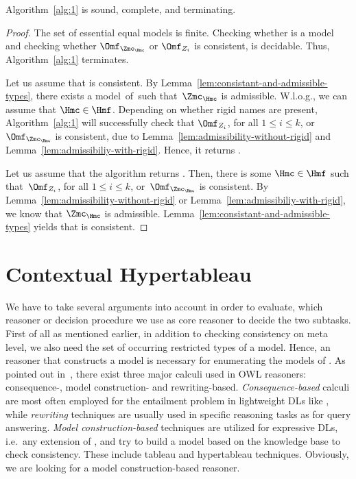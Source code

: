 \begin{lemma}\label{lem:alg1-sound-complete-terminating}
  Algorithm~\ref{alg:1} is sound, complete, and terminating.
\end{lemma}
\begin{proof}
  The set of essential equal models is finite. Checking whether \Hmc is a model and checking whether
  $\Omf_{\Zmc_{\Hmc}}$ or $\Omf_{Z_{i}}$ is consistent, is decidable. Thus, Algorithm~\ref{alg:1}
  terminates.

  Let us assume that \Bmf is consistent. By Lemma~\ref{lem:consistant-and-admissible-types}, there
  exists a model~\Hmc of~\Bmfb such that~$\Zmc_{\Hmc}$ is admissible. W.l.o.g., we can assume that
  $\Hmc\in\Hmf$. 
  Depending on whether rigid names are present, Algorithm~\ref{alg:1} will successfully check that
  $\Omf_{Z_{i}}$, for all $1\leq i \leq k$, or $\Omf_{\Zmc_{\Hmc}}$ is consistent, due to
  Lemma~\ref{lem:admissibility-without-rigid} and Lemma~\ref{lem:admissibiliy-with-rigid}. Hence, it
  returns \true.

  Let us assume that the algorithm returns \true. Then, there is some $\Hmc\in\Hmf$ such that~$\Omf_{Z_{i}}$,
  for all $1\leq i \leq k$, or~$\Omf_{\Zmc_{\Hmc}}$ is consistent. By
  Lemma~\ref{lem:admissibility-without-rigid} or Lemma~\ref{lem:admissibiliy-with-rigid}, we know
  that $\Zmc_{\Hmc}$ is admissible. Lemma~\ref{lem:consistant-and-admissible-types} yields that \Bmf
  is consistent.
\end{proof}



\section{Contextual Hypertableau}
\label{sec:using-hypertableau}

We have to take several arguments into account in order to evaluate, which reasoner or decision
procedure we use as core reasoner to decide the two subtasks.
%
First of all as mentioned earlier, in addition to checking consistency on meta level, we also need
the set of occurring restricted types of a model. Hence, an reasoner that constructs a model is
necessary for enumerating the models of \Bmfb. As pointed out in~\cite{MaLHSP-ORE15}, there exist
three major calculi used in OWL reasoners: consequence-, model construction- and
rewriting-based. \emph{Consequence-based} calculi are most often employed for the entailment problem in
lightweight DLs like \EL, while \emph{rewriting} techniques are usually used in specific reasoning tasks as
for query answering. \emph{Model construction-based} techniques are utilized for expressive DLs, i.e.\ any
extension of \ALC, and try to build a model based on the knowledge base to check consistency. These
include tableau and hypertableau techniques. Obviously, we are looking for a model
construction-based reasoner.

